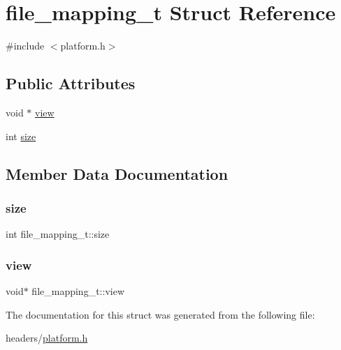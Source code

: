 \hypertarget{structfile__mapping__t}{}\section{file\+\_\+mapping\+\_\+t Struct Reference}
\label{structfile__mapping__t}


{\ttfamily \#include $<$platform.\+h$>$}

\subsection*{Public Attributes}
\begin{DoxyCompactItemize}
\item 
void $\ast$ \hyperlink{structfile__mapping__t_a97515f2c3caa3e138996fd539129ba52}{view}
\item 
int \hyperlink{structfile__mapping__t_a8dafaf6c62bbd9834bf92db943c7fc08}{size}
\end{DoxyCompactItemize}


\subsection{Member Data Documentation}
\mbox{\label{structfile__mapping__t_a8dafaf6c62bbd9834bf92db943c7fc08}} 
\subsubsection{\texorpdfstring{size}{size}}
{\footnotesize\ttfamily int file\+\_\+mapping\+\_\+t\+::size}

\mbox{\label{structfile__mapping__t_a97515f2c3caa3e138996fd539129ba52}} 
\subsubsection{\texorpdfstring{view}{view}}
{\footnotesize\ttfamily void$\ast$ file\+\_\+mapping\+\_\+t\+::view}



The documentation for this struct was generated from the following file\+:\begin{DoxyCompactItemize}
\item 
headers/\hyperlink{platform_8h}{platform.\+h}\end{DoxyCompactItemize}
